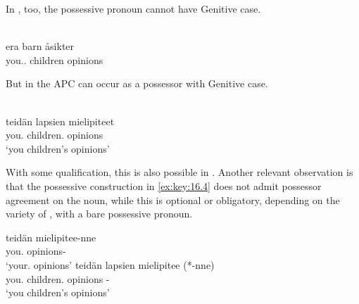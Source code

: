\documentclass[output=paper]{langsci/langscibook}
\begin{document}
In , too, the possessive pronoun cannot have Genitive case.

\ea\label{ex:key:16.3}\\
    \gll   \llap{*}era                barn       åsikter\\
            you.\Pl{}.\Poss{} children opinions \\
\z

But in  the \gls{APC} can occur as a possessor with Genitive case.

\ea\label{ex:key:16.4}\\
    \gll teidän       lapsien            mielipiteet \\
        you.\Gen{} children.\Gen{} opinions\\
	\glt    `you children’s opinions'
\z

With some qualification, this is also possible in . Another relevant
observation is that the possessive construction in \eqref{ex:key:16.4} does not admit possessor
agreement on the noun, while this is optional or obligatory, depending on the
variety of , with a bare possessive pronoun.

\ea\label{ex:key:16.5}
	\ea
		\gll teidän       mielipitee-nne \\
			you.\Gen{} opinions-\Spl{}\\
		\glt    `your.\Pl{} opinions'
	\ex
		\gll teidän       lapsien             mielipitee (*-nne)\\
            you.\Gen{} children.\Gen{} opinions \hphantom{(*}-\Spl{}\\
		\glt    `you children’s opinions'
	\z
\z
\end{document}
